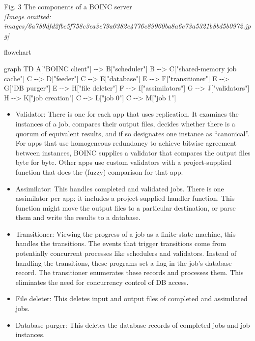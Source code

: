 \documentclass[
]{article}
\newenvironment{Shaded}{}{}
\newcommand{\NormalTok}[1]{#1}
\providecommand{\tightlist}{%
  \setlength{\itemsep}{0pt}\setlength{\parskip}{0pt}}
\begin{document}
Fig. 3 The components of a BOINC server\\
\textit{[Image omitted: images/6a789dfd2fbc5f758c3ea3e79a0382e4776c89960ba8a6e73a5321b8bd5b0972.jpg]}

flowchart

\begin{Shaded}
\begin{Highlighting}[]
\NormalTok{graph TD}
\NormalTok{    A["BOINC client"] {-}{-}\textgreater{} B["scheduler"]}
\NormalTok{    B {-}{-}\textgreater{} C["shared{-}memory job cache"]}
\NormalTok{    C {-}{-}\textgreater{} D["feeder"]}
\NormalTok{    C {-}{-}\textgreater{} E["database"]}
\NormalTok{    E {-}{-}\textgreater{} F["transitioner"]}
\NormalTok{    E {-}{-}\textgreater{} G["DB purger"]}
\NormalTok{    E {-}{-}\textgreater{} H["file deleter"]}
\NormalTok{    F {-}{-}\textgreater{} I["assimilators"]}
\NormalTok{    G {-}{-}\textgreater{} J["validators"]}
\NormalTok{    H {-}{-}\textgreater{} K["job creation"]}
\NormalTok{    C {-}{-}\textgreater{} L["job 0"]}
\NormalTok{    C {-}{-}\textgreater{} M["job 1"]}
\end{Highlighting}
\end{Shaded}

\begin{itemize}
\tightlist
\item
  Validator: There is one for each app that uses replication. It
  examines the instances of a job, compares their output files, decides
  whether there is a quorum of equivalent results, and if so designates
  one instance as ``canonical''. For apps that use homogeneous
  redundancy to achieve bitwise agreement between instances, BOINC
  supplies a validator that compares the output files byte for byte.
  Other apps use custom validators with a project-supplied function that
  does the (fuzzy) comparison for that app.\\
\item
  Assimilator: This handles completed and validated jobs. There is one
  assimilator per app; it includes a project-supplied handler function.
  This function might move the output files to a particular destination,
  or parse them and write the results to a database.\\
\item
  Transitioner: Viewing the progress of a job as a finite-state machine,
  this handles the transitions. The events that trigger transitions come
  from potentially concurrent processes like schedulers and validators.
  Instead of handling the transitions, these programs set a flag in the
  job's database record. The transitioner enumerates these records and
  processes them. This eliminates the need for concurrency control of DB
  access.\\
\item
  File deleter: This deletes input and output files of completed and
  assimilated jobs.\\
\item
  Database purger: This deletes the database records of completed jobs
  and job instances.
\end{itemize}
\end{document}

